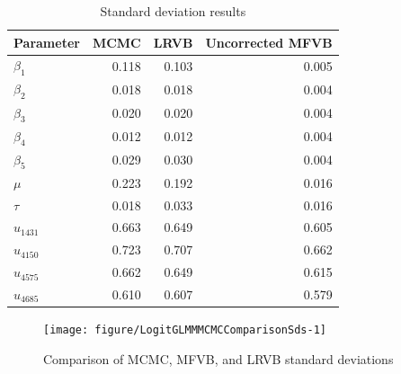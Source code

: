 \documentclass{article}\usepackage[]{graphicx}\usepackage[]{color}
\newenvironment{knitrout}{}{}
\theoremstyle{definition}
\theoremstyle{plain}
\theoremstyle{plain}
\theoremstyle{plain}
\theoremstyle{definition}
\theoremstyle{plain}
\theoremstyle{plain}
\begin{document}
\begin{table}
\begin{center}\begin{tabular}{lrrr}
  \hline
Parameter & MCMC & LRVB & Uncorrected MFVB \\ 
  \hline
$\beta_{1}$ & 0.118 & 0.103 & 0.005 \\ 
  $\beta_{2}$ & 0.018 & 0.018 & 0.004 \\ 
  $\beta_{3}$ & 0.020 & 0.020 & 0.004 \\ 
  $\beta_{4}$ & 0.012 & 0.012 & 0.004 \\ 
  $\beta_{5}$ & 0.029 & 0.030 & 0.004 \\ 
  $\mu$ & 0.223 & 0.192 & 0.016 \\ 
  $\tau$ & 0.018 & 0.033 & 0.016 \\ 
  $u_{1431}$ & 0.663 & 0.649 & 0.605 \\ 
  $u_{4150}$ & 0.723 & 0.707 & 0.662 \\ 
  $u_{4575}$ & 0.662 & 0.649 & 0.615 \\ 
  $u_{4685}$ & 0.610 & 0.607 & 0.579 \\ 
   \hline
\end{tabular}
\end{center}
\caption{Standard deviation results\label{tab:sd_results}}
\end{table}


\begin{knitrout}
\color{fgcolor}\begin{figure}[t]

{\centering \texttt{[image: figure/LogitGLMMMCMCComparisonSds-1]} 

}

\caption[Comparison of MCMC, MFVB, and LRVB standard deviations]{Comparison of MCMC, MFVB, and LRVB standard deviations}\label{fig:LogitGLMMMCMCComparisonSds}
\end{figure}


\end{knitrout}
\end{document}
